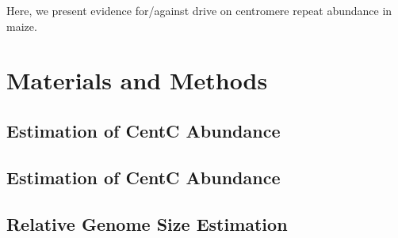 \documentclass[12pt]{article}
\begin{document}

Here, we present evidence for/against drive on centromere repeat abundance in maize.     

\section{Materials and Methods}

\subsection{Estimation of CentC Abundance} %

\subsection{Estimation of CentC Abundance} %


\subsection{Relative Genome Size Estimation } %
\end{document}
